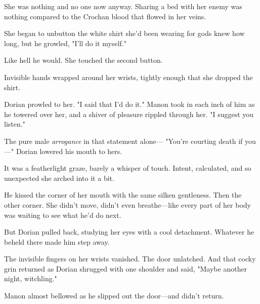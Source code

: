 She was nothing and no one now anyway. Sharing a bed with her enemy was nothing compared to the Crochan blood that flowed in her veins.

She began to unbutton the white shirt she'd been wearing for gods knew how long, but he growled, "I'll do it myself."

Like hell he would. She touched the second button.

Invisible hands wrapped around her wrists, tightly enough that she dropped the shirt.

Dorian prowled to her. "I said that I'd do it." Manon took in each inch of him as he towered over her, and a shiver of pleasure rippled through her. "I suggest you listen."

The pure male \emph{arrogance} in that statement alone--- "You're courting death if you---" Dorian lowered his mouth to hers.

It was a featherlight graze, barely a whisper of touch. Intent, calculated, and so unexpected she arched into it a bit.

He kissed the corner of her mouth with the same silken gentleness. Then the other corner. She didn't move, didn't even breathe---like every part of her body was waiting to see what he'd do next.

But Dorian pulled back, studying her eyes with a cool detachment. Whatever he beheld there made him step away.

The invisible fingers on her wrists vanished. The door unlatched. And that cocky grin returned as Dorian shrugged with one shoulder and said, "Maybe another night, witchling."

Manon almost bellowed as he slipped out the door---and didn't return.
